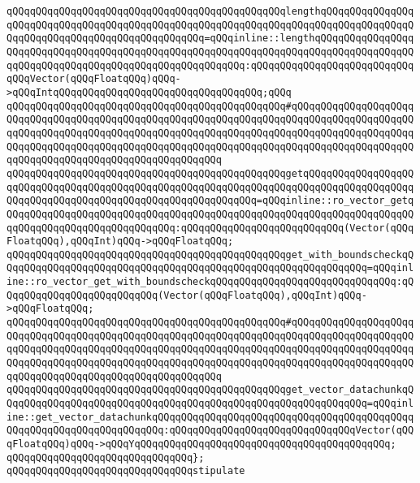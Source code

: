 \verb|qQQqqQQqqQQqqQQqqQQqqQQqqQQqqQQqqQQqqQQqqQQqqQQqlengthqQQqqQQqqQQqqQQqqQQqqQQqqQQqqQQqqQQqqQQqqQQqqQQqqQQqqQQqqQQqqQQqqQQqqQQqqQQqqQQqqQQqqQQqqQQqqQQqqQQqqQQqqQQqqQQqqQQqqQQq=qQQqinline::lengthqQQqqQQqqQQqqQQqqQQqqQQqqQQqqQQqqQQqqQQqqQQqqQQqqQQqqQQqqQQqqQQqqQQqqQQqqQQqqQQqqQQqqQQqqQQqqQQqqQQqqQQqqQQqqQQqqQQqqQQqqQQqqQQq:qQQqqQQqqQQqqQQqqQQqqQQqqQQqqQQqVector(qQQqFloatqQQq)qQQq->qQQqIntqQQqqQQqqQQqqQQqqQQqqQQqqQQqqQQqqQQq;qQQq|\newline
\verb|qQQqqQQqqQQqqQQqqQQqqQQqqQQqqQQqqQQqqQQqqQQqqQQq#qQQqqQQqqQQqqQQqqQQqqQQqqQQqqQQqqQQqqQQqqQQqqQQqqQQqqQQqqQQqqQQqqQQqqQQqqQQqqQQqqQQqqQQqqQQqqQQqqQQqqQQqqQQqqQQqqQQqqQQqqQQqqQQqqQQqqQQqqQQqqQQqqQQqqQQqqQQqqQQqqQQqqQQqqQQqqQQqqQQqqQQqqQQqqQQqqQQqqQQqqQQqqQQqqQQqqQQqqQQqqQQqqQQqqQQqqQQqqQQqqQQqqQQqqQQqqQQqqQQqqQQqqQQq|\newline
\verb|qQQqqQQqqQQqqQQqqQQqqQQqqQQqqQQqqQQqqQQqqQQqqQQqgetqQQqqQQqqQQqqQQqqQQqqQQqqQQqqQQqqQQqqQQqqQQqqQQqqQQqqQQqqQQqqQQqqQQqqQQqqQQqqQQqqQQqqQQqqQQqqQQqqQQqqQQqqQQqqQQqqQQqqQQqqQQqqQQqqQQq=qQQqinline::ro_vector_getqQQqqQQqqQQqqQQqqQQqqQQqqQQqqQQqqQQqqQQqqQQqqQQqqQQqqQQqqQQqqQQqqQQqqQQqqQQqqQQqqQQqqQQqqQQqqQQqqQQq:qQQqqQQqqQQqqQQqqQQqqQQqqQQq(Vector(qQQqFloatqQQq),qQQqInt)qQQq->qQQqFloatqQQq;|\newline
\verb|qQQqqQQqqQQqqQQqqQQqqQQqqQQqqQQqqQQqqQQqqQQqqQQqget_with_boundscheckqQQqqQQqqQQqqQQqqQQqqQQqqQQqqQQqqQQqqQQqqQQqqQQqqQQqqQQqqQQqqQQq=qQQqinline::ro_vector_get_with_boundscheckqQQqqQQqqQQqqQQqqQQqqQQqqQQqqQQq:qQQqqQQqqQQqqQQqqQQqqQQqqQQq(Vector(qQQqFloatqQQq),qQQqInt)qQQq->qQQqFloatqQQq;|\newline
\verb|qQQqqQQqqQQqqQQqqQQqqQQqqQQqqQQqqQQqqQQqqQQqqQQq#qQQqqQQqqQQqqQQqqQQqqQQqqQQqqQQqqQQqqQQqqQQqqQQqqQQqqQQqqQQqqQQqqQQqqQQqqQQqqQQqqQQqqQQqqQQqqQQqqQQqqQQqqQQqqQQqqQQqqQQqqQQqqQQqqQQqqQQqqQQqqQQqqQQqqQQqqQQqqQQqqQQqqQQqqQQqqQQqqQQqqQQqqQQqqQQqqQQqqQQqqQQqqQQqqQQqqQQqqQQqqQQqqQQqqQQqqQQqqQQqqQQqqQQqqQQqqQQqqQQqqQQqqQQq|\newline
\verb|qQQqqQQqqQQqqQQqqQQqqQQqqQQqqQQqqQQqqQQqqQQqqQQqget_vector_datachunkqQQqqQQqqQQqqQQqqQQqqQQqqQQqqQQqqQQqqQQqqQQqqQQqqQQqqQQqqQQqqQQq=qQQqinline::get_vector_datachunkqQQqqQQqqQQqqQQqqQQqqQQqqQQqqQQqqQQqqQQqqQQqqQQqqQQqqQQqqQQqqQQqqQQqqQQq:qQQqqQQqqQQqqQQqqQQqqQQqqQQqqQQqVector(qQQqFloatqQQq)qQQq->qQQqYqQQqqQQqqQQqqQQqqQQqqQQqqQQqqQQqqQQqqQQqqQQq;|\newline
\verb|qQQqqQQqqQQqqQQqqQQqqQQqqQQqqQQq};|\newline
\newline
\verb|qQQqqQQqqQQqqQQqqQQqqQQqqQQqqQQqstipulate|\newline
